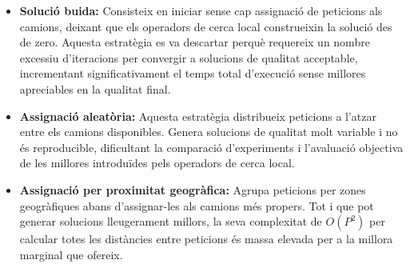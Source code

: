 \begin{itemize}
     \item \textbf{Solució buida:} Consisteix en iniciar sense cap assignació de peticions als camions, deixant que els operadors de cerca local construeixin la solució des de zero. Aquesta estratègia es va descartar perquè requereix un nombre excessiu d'iteracions per convergir a solucions de qualitat acceptable, incrementant significativament el temps total d'execució sense millores apreciables en la qualitat final.

    \item \textbf{Assignació aleatòria:} Aquesta estratègia distribueix peticions a l'atzar entre els camions disponibles. Genera solucions de qualitat molt variable i no és reproducible, dificultant la comparació d'experiments i l'avaluació objectiva de les millores introduïdes pels operadors de cerca local.
    
    \item \textbf{Assignació per proximitat geogràfica:} Agrupa peticions per zones geogràfiques abans d'assignar-les als camions més propers. Tot i que pot generar solucions lleugerament millors, la seva complexitat de $O(P^2)$ per calcular totes les distàncies entre peticions és massa elevada per a la millora marginal que ofereix.
    
\end{itemize}